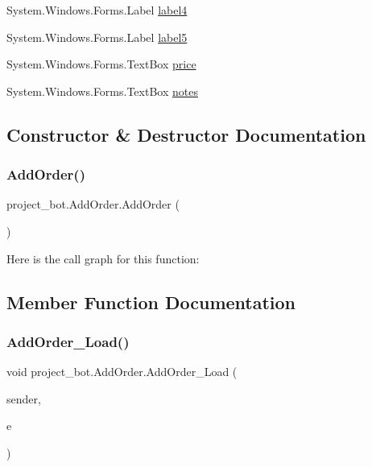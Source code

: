 \begin{DoxyCompactItemize}
\item 
System.\+Windows.\+Forms.\+Label \hyperlink{classproject__bot_1_1_add_order_a1ef070f403fd749a1bf2cf725cd388c7}{label4}
\item 
System.\+Windows.\+Forms.\+Label \hyperlink{classproject__bot_1_1_add_order_a14c4cf652acdaba94b7121bbe91da143}{label5}
\item 
System.\+Windows.\+Forms.\+Text\+Box \hyperlink{classproject__bot_1_1_add_order_a53552ba1fa80a3592e85dce5f52cfd05}{price}
\item 
System.\+Windows.\+Forms.\+Text\+Box \hyperlink{classproject__bot_1_1_add_order_a09fced4999445fd93c5e416c29c4f5c4}{notes}
\end{DoxyCompactItemize}


\subsection{Constructor \& Destructor Documentation}
\mbox{\label{classproject__bot_1_1_add_order_a70759d62195c7b92d5680be53ca76937}} 
\subsubsection{\texorpdfstring{Add\+Order()}{AddOrder()}}
{\footnotesize\ttfamily project\+\_\+bot.\+Add\+Order.\+Add\+Order (\begin{DoxyParamCaption}{ }\end{DoxyParamCaption})}

Here is the call graph for this function\+:


\subsection{Member Function Documentation}
\mbox{\label{classproject__bot_1_1_add_order_a3d32201f08112f66db4b7276f14b083d}} 
\subsubsection{\texorpdfstring{Add\+Order\+\_\+\+Load()}{AddOrder\_Load()}}
{\footnotesize\ttfamily void project\+\_\+bot.\+Add\+Order.\+Add\+Order\+\_\+\+Load (\begin{DoxyParamCaption}\item[{object}]{sender,  }\item[{Event\+Args}]{e }\end{DoxyParamCaption})\hspace{0.3cm}{\ttfamily [private]}}

